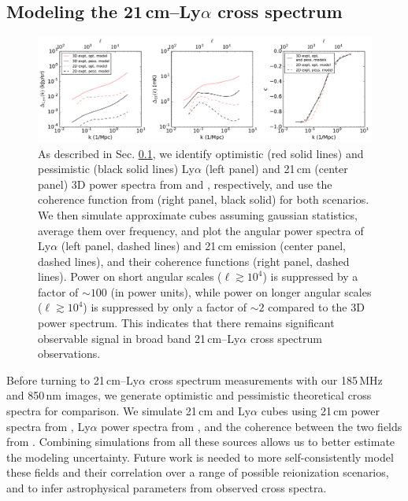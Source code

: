 \documentclass[numberedappendix]{emulateapj}
\begin{document}
\subsection{Modeling the 21\,cm--Ly$\alpha$ cross spectrum}
\label{sec:modelingthecrossspectrum}

\begin{figure}[h]
\centering
\includegraphics[width=7in]{images/spectra3D_to_2D.pdf}
\caption{As described in Sec. \ref{sec:modelingthecrossspectrum}, we identify optimistic (red solid lines) and pessimistic (black solid lines) Ly$\alpha$ (left panel) and 21\,cm (center panel) 3D power spectra from \citet{Gong2014} and \citet{PoberNextGen}, respectively, and use the coherence function from \citet{Heneka2016} (right panel, black solid) for both scenarios. We then simulate approximate cubes assuming gaussian statistics, average them over frequency, and plot the angular power spectra of Ly$\alpha$ (left panel, dashed lines) and 21\,cm emission (center panel, dashed lines), and their coherence functions (right panel, dashed lines). Power on short angular scales ($\ell\gtrsim10^4$) is suppressed by a factor of $\sim100$ (in power units), while power on longer angular scales ($\ell\gtrsim10^4$) is suppressed by only a factor of $\sim2$ compared to the 3D power spectrum. This indicates that there remains significant observable signal in broad band 21\,cm--Ly$\alpha$ cross spectrum observations. }
\label{fig:spectra3Dto2D}
\end{figure}

Before turning to 21\,cm--Ly$\alpha$ cross spectrum measurements with our 185\,MHz and 850\,nm images, we generate optimistic and pessimistic theoretical cross spectra for comparison. We simulate 21\,cm and Ly$\alpha$ cubes using 21\,cm power spectra from \citet{PoberNextGen}, Ly$\alpha$ power spectra from \citet{Gong2014}, and the coherence between the two fields from \citet{Heneka2016}. Combining simulations from all these sources allows us to better estimate the modeling uncertainty. Future work is needed to more self-consistently model these fields and their correlation over a range of possible reionization scenarios, and to infer astrophysical parameters from observed cross spectra.
\end{document}
